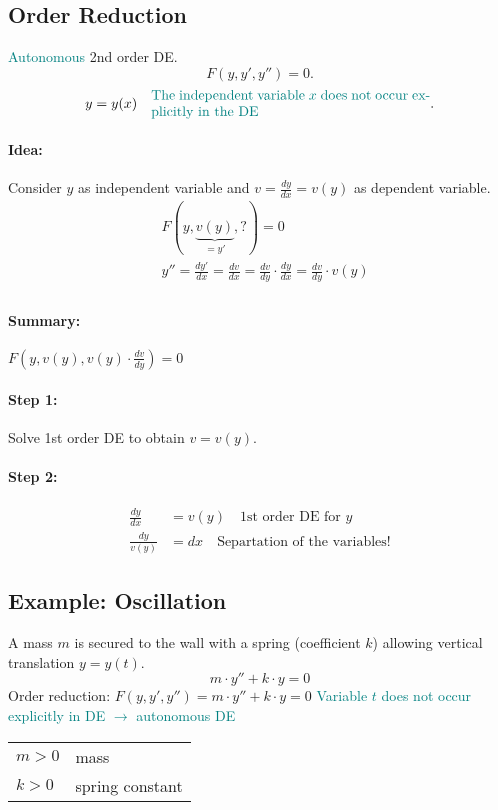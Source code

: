 \documentclass[]{article}
\begin{document}
\subsection{Order Reduction}
\textcolor{teal}{Autonomous} 2nd order DE.
\[
F(y,y',y'')=0
.\]
\[
	y=y(x)\quad\parbox{20em}{ \textcolor{teal}{The independent variable $x$ does not occur explicitly in the DE}}
.\]
\paragraph{Idea:} Consider $y$ as independent variable and $v= \frac{dy}{dx}=v(y)$ as dependent variable.
\[
\begin{split}
	& F(y,\underbrace{v(y)}_{=y'},?)=0\\
	& y''= \frac{dy'}{dx}= \frac{dv}{dx}= \frac{dv}{dy} \cdot \frac{dy}{dx}= \frac{dv}{dy} \cdot v(y)\\
\end{split}
\]
\paragraph{Summary:} $F(y,v(y),v(y) \cdot \frac{dv}{dy})=0$
\paragraph{Step 1:} Solve 1st order DE to obtain $v=v(y)$.
\paragraph{Step 2:} \[
\begin{split}
	\frac{dy}{dx} &=v(y)\quad  \text{1st order DE for $y$}\\
	\frac{dy}{v(y)} &= dx \quad \text{Separtation of the variables!}
\end{split}
\]
\subsection{Example: Oscillation}
A mass $m$ is secured to the wall with a spring (coefficient $k$) allowing vertical translation $y=y(t)$.
\[
m \cdot  y'' +k \cdot y=0
\]
Order reduction: $F(y,y',y'')= m \cdot y'' +k \cdot y=0$
\textcolor{teal}{Variable $t$ does not occur explicitly in DE $\to$ autonomous DE}\\
\begin{tabular}{@{}l l}
	$m >0$ & mass\\
	$k > 0$ & spring constant\\
\end{tabular}
\end{document}
